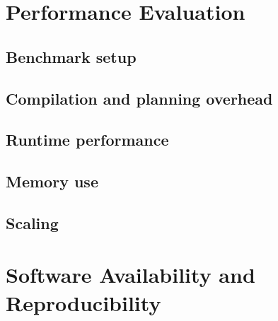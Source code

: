 \documentclass[11pt]{article}
\begin{document}
\section{Performance Evaluation}
\label{sec:performance}


\subsection{Benchmark setup}


\subsection{Compilation and planning overhead}


\subsection{Runtime performance}


\subsection{Memory use}


\subsection{Scaling}


\section{Software Availability and Reproducibility}
\label{sec:software}
\end{document}
